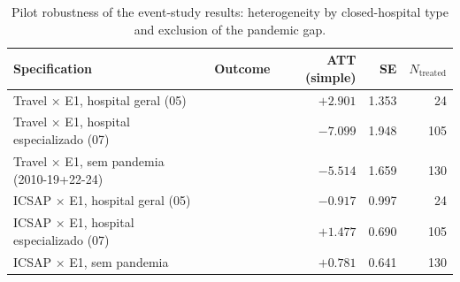 \begin{table}[h!]
\centering
\caption{Pilot robustness of the event-study results: heterogeneity by closed-hospital type and exclusion of the pandemic gap.}
\label{tab:es-robustness}
\small
\begin{tabular}{llrrr}
\toprule
Specification & Outcome & ATT (simple) & SE & $N_{\text{treated}}$ \\
\midrule
Travel × E1, hospital geral (05) & & $+2.901$ & 1.353 & 24 \\
Travel × E1, hospital especializado (07) & & $-7.099$ & 1.948 & 105 \\
Travel × E1, sem pandemia (2010-19+22-24) & & $-5.514$ & 1.659 & 130 \\
ICSAP × E1, hospital geral (05) & & $-0.917$ & 0.997 & 24 \\
ICSAP × E1, hospital especializado (07) & & $+1.477$ & 0.690 & 105 \\
ICSAP × E1, sem pandemia & & $+0.781$ & 0.641 & 130 \\
\bottomrule
\end{tabular}
\end{table}
